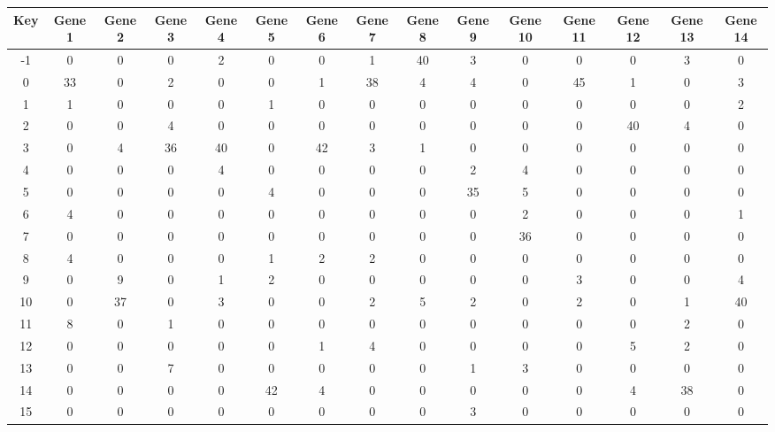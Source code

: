 \begin{tabular}{|c|c|c|c|c|c|c|c|c|c|c|c|c|c|c|}
\hline
Key & Gene 1 & Gene 2 & Gene 3 & Gene 4 & Gene 5 & Gene 6 & Gene 7 & Gene 8 & Gene 9 & Gene 10 & Gene 11 & Gene 12 & Gene 13 & Gene 14 \\
\hline
-1 & 0 & 0 & 0 & 2 & 0 & 0 & 1 & 40 & 3 & 0 & 0 & 0 & 3 & 0 \\
0 & 33 & 0 & 2 & 0 & 0 & 1 & 38 & 4 & 4 & 0 & 45 & 1 & 0 & 3 \\
1 & 1 & 0 & 0 & 0 & 1 & 0 & 0 & 0 & 0 & 0 & 0 & 0 & 0 & 2 \\
2 & 0 & 0 & 4 & 0 & 0 & 0 & 0 & 0 & 0 & 0 & 0 & 40 & 4 & 0 \\
3 & 0 & 4 & 36 & 40 & 0 & 42 & 3 & 1 & 0 & 0 & 0 & 0 & 0 & 0 \\
4 & 0 & 0 & 0 & 4 & 0 & 0 & 0 & 0 & 2 & 4 & 0 & 0 & 0 & 0 \\
5 & 0 & 0 & 0 & 0 & 4 & 0 & 0 & 0 & 35 & 5 & 0 & 0 & 0 & 0 \\
6 & 4 & 0 & 0 & 0 & 0 & 0 & 0 & 0 & 0 & 2 & 0 & 0 & 0 & 1 \\
7 & 0 & 0 & 0 & 0 & 0 & 0 & 0 & 0 & 0 & 36 & 0 & 0 & 0 & 0 \\
8 & 4 & 0 & 0 & 0 & 1 & 2 & 2 & 0 & 0 & 0 & 0 & 0 & 0 & 0 \\
9 & 0 & 9 & 0 & 1 & 2 & 0 & 0 & 0 & 0 & 0 & 3 & 0 & 0 & 4 \\
10 & 0 & 37 & 0 & 3 & 0 & 0 & 2 & 5 & 2 & 0 & 2 & 0 & 1 & 40 \\
11 & 8 & 0 & 1 & 0 & 0 & 0 & 0 & 0 & 0 & 0 & 0 & 0 & 2 & 0 \\
12 & 0 & 0 & 0 & 0 & 0 & 1 & 4 & 0 & 0 & 0 & 0 & 5 & 2 & 0 \\
13 & 0 & 0 & 7 & 0 & 0 & 0 & 0 & 0 & 1 & 3 & 0 & 0 & 0 & 0 \\
14 & 0 & 0 & 0 & 0 & 42 & 4 & 0 & 0 & 0 & 0 & 0 & 4 & 38 & 0 \\
15 & 0 & 0 & 0 & 0 & 0 & 0 & 0 & 0 & 3 & 0 & 0 & 0 & 0 & 0 \\
\hline
\end{tabular}